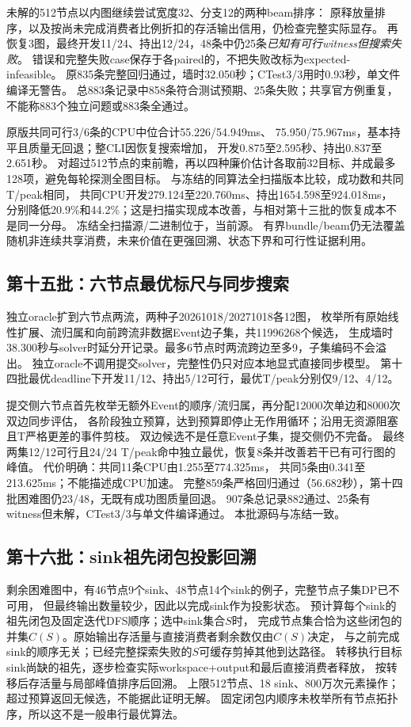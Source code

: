 \documentclass[UTF8,a4paper,11pt,fontset=fandol]{ctexart}
\begin{document}
未解的512节点以内图继续尝试宽度32、分支12的两种beam排序：
原释放量排序，以及按尚未完成消费者比例折扣的存活输出信用，仍检查完整实际显存。
再恢复3图，最终开发11/24、持出12/24，48条中仍25条\emph{已知有可行witness但搜索失败}。
错误和完整失败case保存于各paired的，不把失败改标为expected-infeasible。
原835条完整回归通过，墙时32.050秒；CTest3/3用时0.93秒，单文件编译无警告。
总883条记录中858条符合测试预期、25条失败；共享官方例重复，不能称883个独立问题或883条全通过。

原版共同可行3/6条的CPU中位合计55.226/\allowbreak{}54.949ms、
75.950/\allowbreak{}75.967ms，基本持平且质量无回退；整CLI因恢复搜索增加，
开发0.875至2.595秒、持出0.837至2.651秒。
对超过512节点的束前瞻，再以四种廉价估计各取前32目标、并成最多128项，避免每轮探测全图目标。
与冻结的同算法全扫描版本比较，成功数和共同T/peak相同，
共同CPU开发279.124至220.760ms、持出1654.598至924.018ms，
分别降低20.9\%和44.2\%；这是扫描实现成本改善，与相对第十三批的恢复成本不是同一分母。
冻结全扫描源/二进制位于，当前源。
有界bundle/beam仍无法覆盖随机非连续共享消费，未来价值在更强回溯、状态下界和可行性证据利用。

\subsection{第十五批：六节点最优标尺与同步搜索}
独立oracle扩到六节点两流，两种子20261018/20271018各12图，
枚举所有原始线性扩展、流归属和向前跨流非数据Event边子集，共11996268个候选，
生成墙时38.300秒与solver时延分开记录。最多6节点时两流跨边至多9，子集编码不会溢出。
独立oracle不调用提交solver，完整性仍只对应本地显式直接同步模型。
第十四批最优deadline下开发11/12、持出5/12可行，最优T/peak分别仅9/12、4/12。

提交侧六节点首先枚举无额外Event的顺序/流归属，再分配12000次单边和8000次双边同步评估，
各阶段独立预算，达到预算即停止无作用循环；沿用无资源阻塞且T严格更差的事件剪枝。
双边候选不是任意Event子集，提交侧仍不完备。
最终两集12/12可行且24/24 T/peak命中独立最优，恢复8条并改善若干已有可行图的峰值。
代价明确：共同11条CPU由1.255至774.325ms，
共同5条由0.341至213.625ms；不能描述成CPU加速。
完整859条严格回归通过（56.682秒），第十四批困难图仍23/48，无既有成功图质量回退。
907条总记录882通过、25条有witness但未解，CTest3/3与单文件编译通过。
本批源码与冻结一致。

\subsection{第十六批：sink祖先闭包投影回溯}
剩余困难图中，有46节点9个sink、48节点14个sink的例子，完整节点子集DP已不可用，
但最终输出数量较少，因此以完成sink作为投影状态。
预计算每个sink的祖先闭包及固定迭代DFS顺序；选中sink集合$S$时，
完成节点集合恰为这些闭包的并集$C(S)$。原始输出存活量与直接消费者剩余数仅由$C(S)$决定，
与之前完成sink的顺序无关；已经完整探索失败的$S$可缓存剪掉其他到达路径。
转移执行目标sink尚缺的祖先，逐步检查实际workspace+output和最后直接消费者释放，
按转移后存活量与局部峰值排序后回溯。
上限512节点、18 sink、800万次元素操作；超过预算返回无候选，不能据此证明无解。
固定闭包内顺序未枚举所有节点拓扑序，所以这不是一般串行最优算法。
\end{document}
